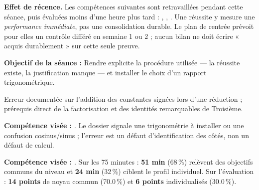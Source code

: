 \documentclass[10pt,a4paper]{article}
\begin{document}
\begin{warningbox}\textbf{Effet de récence.} Les compétences suivantes sont retravaillées pendant cette séance, puis évaluées moins d'une heure plus tard : , , . Une réussite y mesure une \emph{performance immédiate}, pas une consolidation durable. Le plan de rentrée prévoit pour elles un contrôle différé en semaine 1 ou 2 ; aucun bilan ne doit écrire « acquis durablement » sur cette seule preuve.\end{warningbox}
\begin{goalbox}\textbf{Objectif de la séance :} Rendre explicite la procédure utilisée — la réussite existe, la justification manque — et installer le choix d'un rapport trigonométrique.\end{goalbox}
Erreur documentée sur l'addition des constantes signées lors d'une réduction ; prérequis direct de la factorisation et des identités remarquables de Troisième.
\par\vspace{1mm}\textbf{Compétence visée :} .
Le dossier signale une trigonométrie à installer ou une confusion cosinus/sinus ; l'erreur est un défaut d'identification des côtés, non un défaut de calcul.
\par\vspace{1mm}\textbf{Compétence visée :} .
Sur les 75 minutes : \textbf{51 min} (68\,\%) relèvent des objectifs communs du niveau et \textbf{24 min} (32\,\%) ciblent le profil individuel. Sur l'évaluation : \textbf{14 points} de noyau commun (70.0\,\%) et \textbf{6 points} individualisés (30.0\,\%).
\newpage{}
\end{document}
